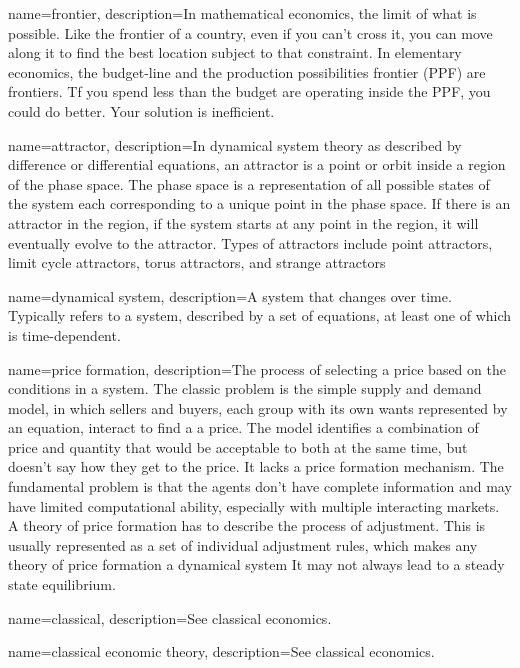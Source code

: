 {
name=frontier,
description={In mathematical economics, the limit of what is possible. Like the frontier of a country, even if you can't cross it, you can move along it to find the best location  subject to that constraint. In elementary economics, the budget-line and the production possibilities frontier (PPF) are  frontiers. Tf you spend less than the budget are operating inside the PPF, you could do better. Your solution is inefficient. }
}

{
name=attractor,
description={In \gls{dynamical system} theory as described by difference or differential equations, an attractor is a point or orbit inside a region of the phase space. The phase space is a representation of all possible states of the system each corresponding to a unique point in the phase space. If there is an attractor in the region, if the system starts at any point in the region, it will eventually evolve to the attractor. Types of attractors include point attractors, limit cycle attractors, torus attractors, and strange attractors}
}

{
name=dynamical system,
description={A system that changes over time. Typically refers to %
a system, described by a set of equations, at least one of which is time-dependent.}
}

{
name=price formation,
description={The process of selecting a price based on the conditions in a system. The classic problem is the simple supply and demand model, in which sellers and buyers, each group with its own wants represented by an equation, interact to find a a price. The model  identifies a combination of price and quantity that would be acceptable to both at the same time, but doesn't say how they get to the price. It lacks a price formation mechanism.  \newline The fundamental problem is that the agents don't have complete information and may have limited computational ability, especially with multiple interacting markets. A theory of price formation has to describe the process of adjustment. This is usually represented as a set of individual adjustment rules, which makes any theory of price formation a dynamical system It may not always lead to a steady state equilibrium.}
}

{
name=classical,
description={See \gls{classical economics}.}
}

{
name=classical economic theory,
description={See \gls{classical economics}.}
}

